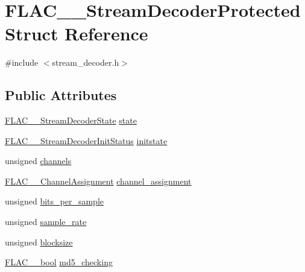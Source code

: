 \hypertarget{struct_f_l_a_c_____stream_decoder_protected}{}\section{F\+L\+A\+C\+\_\+\+\_\+\+Stream\+Decoder\+Protected Struct Reference}
\label{struct_f_l_a_c_____stream_decoder_protected}


{\ttfamily \#include $<$stream\+\_\+decoder.\+h$>$}

\subsection*{Public Attributes}
\begin{DoxyCompactItemize}
\item 
\hyperlink{group__flac__stream__decoder_ga3adb6891c5871a87cd5bbae6c770ba2d}{F\+L\+A\+C\+\_\+\+\_\+\+Stream\+Decoder\+State} \hyperlink{struct_f_l_a_c_____stream_decoder_protected_a821004809712ae29f96137b5a3a72057}{state}
\item 
\hyperlink{group__flac__stream__decoder_gaaed54a24ac6310d29c5cafba79759c44}{F\+L\+A\+C\+\_\+\+\_\+\+Stream\+Decoder\+Init\+Status} \hyperlink{struct_f_l_a_c_____stream_decoder_protected_a20152b0ff6c0e1de935c6cba0a06c4ed}{initstate}
\item 
unsigned \hyperlink{struct_f_l_a_c_____stream_decoder_protected_af7f63ea3b944faea8bff36b9f1446947}{channels}
\item 
\hyperlink{group__flac__format_ga79855f8525672e37f299bbe02952ef9c}{F\+L\+A\+C\+\_\+\+\_\+\+Channel\+Assignment} \hyperlink{struct_f_l_a_c_____stream_decoder_protected_a91711a38e514c69336a8880abd172574}{channel\+\_\+assignment}
\item 
unsigned \hyperlink{struct_f_l_a_c_____stream_decoder_protected_a12dde1d4b3bb1e5c1dca28c8341f9b6c}{bits\+\_\+per\+\_\+sample}
\item 
unsigned \hyperlink{struct_f_l_a_c_____stream_decoder_protected_a0a43404f3ff9e115f6b940447317f79f}{sample\+\_\+rate}
\item 
unsigned \hyperlink{struct_f_l_a_c_____stream_decoder_protected_a5739c2293e70e440e9f7cc45e975df73}{blocksize}
\item 
\hyperlink{ordinals_8h_a95103469f1cbd78b8cf250194985b34e}{F\+L\+A\+C\+\_\+\+\_\+bool} \hyperlink{struct_f_l_a_c_____stream_decoder_protected_a7e9d6d7b49d4818180ac9de9a4e989bb}{md5\+\_\+checking}
\end{DoxyCompactItemize}


